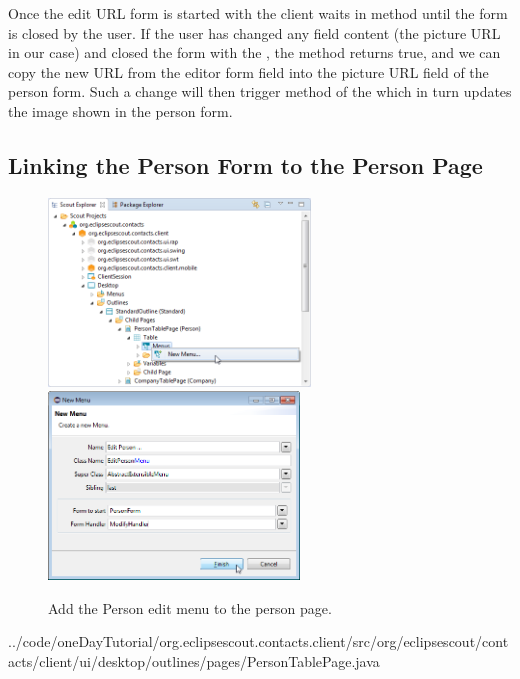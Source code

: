 \documentclass[a4paper,10pt,twoside]{book}
\begin{document}
Once the edit URL form is started with  the client waits in method  until the form is closed by the user. 
If the user has changed any field content (the picture URL in our case) and closed the form with the , the method  returns true, and we can copy the new URL from the editor form field into the picture URL field of the person form. 
Such a change will then trigger method  of the  which in turn updates the image shown in the person form. 

\subsection{Linking the Person Form to the Person Page}

\begin{figure}
\includegraphics[height=5cm]{new_menu_editperson_contextmenu.png} \hspace{5mm}
\includegraphics[height=5cm]{new_menu_editperson.png}
\caption{Add the Person edit menu to the person page.}
\end{figure}


{../code/oneDayTutorial/org.eclipsescout.contacts.client/src/org/eclipsescout/contacts/client/ui/desktop/outlines/pages/PersonTablePage.java}
\end{document}
